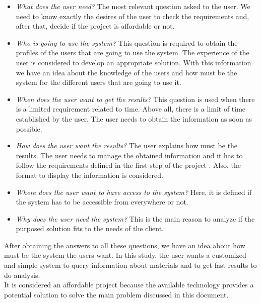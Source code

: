 \begin{itemize}

\item \textit{What does the user need?} The most relevant question asked to the user. We need to know exactly the desires of the user to check the requirements and, after that, decide if the project is affordable or not.

\item \textit{Who is going to use the system?} This question is required to obtain the profiles of the users that are going to use the system. The experience of the user is considered to develop an appropriate solution. With this information we have an idea about the knowledge of the users and how must be the system for the different users that are going to use it.

\item \textit{When does the user want to get the results?} This question is used when there is a limited requirement related to time. Above all, there is a limit of time established by the user. The user needs to obtain the information as soon as possible.

\item \textit{How does the user want the results?} The user explains how must be the results. The user needs to manage the obtained information and it has to follow the requirements defined in the first step of the project . Also, the format to display the information is considered.

\item \textit{Where does the user want to have access to the system?} Here, it is defined if the system has to be accessible from everywhere or not.

\item \textit{Why does the user need the system?} This is the main reason to analyze if the purposed solution fits to the needs of the client.

\end{itemize}

After obtaining the answers to all these questions, we have an idea about how must be the system the users want. In this study, the user wants a customized and simple system to query information about materials and to get fast results to do analysis.\\

It is considered an affordable project because the available technology provides a potential solution to solve the main problem discussed in this document.

